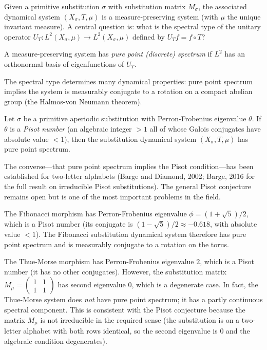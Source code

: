 Given a primitive substitution $\sigma$ with substitution matrix $M_\sigma$, the associated dynamical system $(X_\sigma, T, \mu)$ is a measure-preserving system (with $\mu$ the unique invariant measure). A central question is: what is the spectral type of the unitary operator $U_T: L^2(X_\sigma, \mu) \to L^2(X_\sigma, \mu)$ defined by $U_T f = f \circ T$?

\begin{definition}
A measure-preserving system has \textit{pure point (discrete) spectrum} if $L^2$ has an orthonormal basis of eigenfunctions of $U_T$.

The spectral type determines many dynamical properties: pure point spectrum implies the system is measurably conjugate to a rotation on a compact abelian group (the Halmos-von Neumann theorem).
\end{definition}

\begin{theorem}
Let $\sigma$ be a primitive aperiodic substitution with Perron-Frobenius eigenvalue $\theta$. If $\theta$ is a \textit{Pisot number} (an algebraic integer $> 1$ all of whose Galois conjugates have absolute value $< 1$), then the substitution dynamical system $(X_\sigma, T, \mu)$ has pure point spectrum.

The converse---that pure point spectrum implies the Pisot condition---has been established for two-letter alphabets (Barge and Diamond, 2002; Barge, 2016 for the full result on irreducible Pisot substitutions). The general Pisot conjecture remains open but is one of the most important problems in the field.
\end{theorem}

\begin{example}
The Fibonacci morphism has Perron-Frobenius eigenvalue $\phi = (1+\sqrt{5})/2$, which is a Pisot number (its conjugate is $(1-\sqrt{5})/2 \approx -0.618$, with absolute value $< 1$). The Fibonacci substitution dynamical system therefore has pure point spectrum and is measurably conjugate to a rotation on the torus.
\end{example}

\begin{example}
The Thue-Morse morphism has Perron-Frobenius eigenvalue $2$, which is a Pisot number (it has no other conjugates). However, the substitution matrix $M_\mu = \left(\begin{smallmatrix}1&1\\1&1\end{smallmatrix}\right)$ has second eigenvalue $0$, which is a degenerate case. In fact, the Thue-Morse system does \textit{not} have pure point spectrum; it has a partly continuous spectral component. This is consistent with the Pisot conjecture because the matrix $M_\mu$ is not irreducible in the required sense (the substitution is on a two-letter alphabet with both rows identical, so the second eigenvalue is $0$ and the algebraic condition degenerates).
\end{example}



